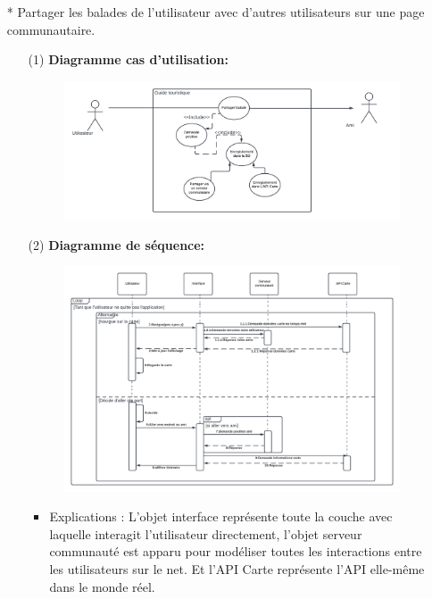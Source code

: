 \documentclass[12pt]{article}
\begin{document}
\begin{itemize}
	\item[* ]  Partager les balades de l’utilisateur avec d’autres utilisateurs sur une page communautaire.
	
	\begin{itemize}
		\item[(1)] \textbf{Diagramme cas d'utilisation:}
		\begin{figure}[!hbtp]
			\centering
			\includegraphics[scale=0.65]{Capture1_s.PNG}
		\end{figure}
	\item[(2)] \textbf{Diagramme de séquence:}
		\begin{figure}[!hbtp]
		\centering
		\includegraphics[scale=0.5]{Capture1.PNG}
	\end{figure}
\begin{itemize}
	\item Explications : 
	L'objet interface représente toute la couche avec laquelle interagit l'utilisateur directement, l'objet serveur communauté est apparu pour modéliser toutes les interactions entre les utilisateurs sur le net. Et l'API Carte représente l'API elle-même dans le monde réel.
	

\end{itemize}
\end{itemize}
\end{itemize}
\end{document}
